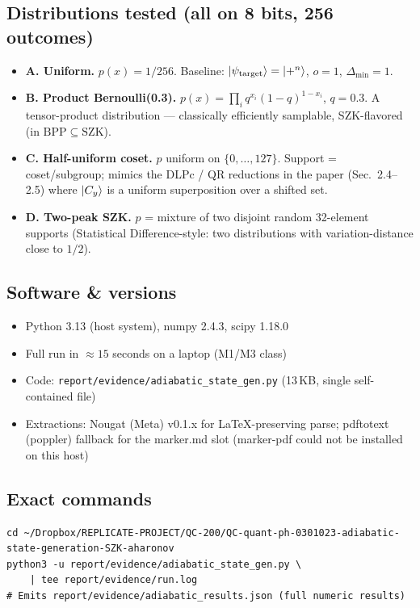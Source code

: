 \documentclass[11pt]{article}
\begin{document}
\subsection{Distributions tested (all on 8 bits, 256 outcomes)}
\begin{itemize}
\item \textbf{A. Uniform.} $p(x) = 1/256$. Baseline: $\ket{\psi_\text{target}}=\ket{+^n}$, $o=1$, $\Delta_\min=1$.
\item \textbf{B. Product Bernoulli(0.3).} $p(x)=\prod_i q^{x_i}(1-q)^{1-x_i}$, $q=0.3$. A tensor-product distribution --- classically efficiently samplable, SZK-flavored (in $\mathrm{BPP}\subseteq\mathrm{SZK}$).
\item \textbf{C. Half-uniform coset.} $p$ uniform on $\{0,\dots,127\}$. Support = coset/subgroup; mimics the DLPc / QR reductions in the paper (Sec.~2.4--2.5) where $\ket{C_y}$ is a uniform superposition over a shifted set.
\item \textbf{D. Two-peak SZK.} $p$ = mixture of two disjoint random 32-element supports (Statistical Difference-style: two distributions with variation-distance close to $1/2$).
\end{itemize}

\subsection{Software \& versions}
\begin{itemize}
\item Python 3.13 (host system), numpy 2.4.3, scipy 1.18.0
\item Full run in $\approx 15$ seconds on a laptop (M1/M3 class)
\item Code: \texttt{report/evidence/adiabatic\_state\_gen.py} (13\,KB, single self-contained file)
\item Extractions: Nougat (Meta) v0.1.x for LaTeX-preserving parse; pdftotext (poppler) fallback for the marker.md slot (marker-pdf could not be installed on this host)
\end{itemize}

\subsection{Exact commands}
\begin{lstlisting}
cd ~/Dropbox/REPLICATE-PROJECT/QC-200/QC-quant-ph-0301023-adiabatic-state-generation-SZK-aharonov
python3 -u report/evidence/adiabatic_state_gen.py \
    | tee report/evidence/run.log
# Emits report/evidence/adiabatic_results.json (full numeric results)
\end{lstlisting}
\end{document}
